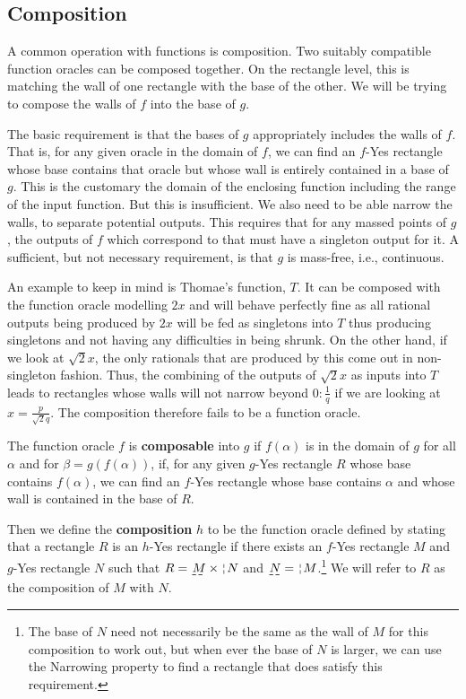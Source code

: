 \documentclass[12pt]{article}
\begin{document}
\subsection{Composition}

A common operation with functions is composition. Two suitably compatible function oracles can be composed together. On the rectangle level, this is matching the wall of one rectangle with the base of the other. We will be trying to compose the walls of $f$ into the base of $g$.

The basic requirement is that the bases of $g$ appropriately includes the walls of $f$. That is, for any given oracle in the domain of $f$, we can find an $f$-Yes rectangle whose base contains that oracle but whose wall is entirely contained in a base of $g$. This is the customary the domain of the enclosing function including the range of the input function. But this is insufficient. We also need to be able narrow the walls, to separate potential outputs. This requires that for any massed points of $g$, the outputs of $f$ which correspond to that must have a singleton output for it. A sufficient, but not necessary requirement, is that $g$ is mass-free, i.e., continuous. 

An example to keep in mind is Thomae's function, $T$. It can be composed with the function oracle modelling $2x$ and will behave perfectly fine as all rational outputs being produced by $2x$ will be fed as singletons into $T$ thus producing singletons and not having any difficulties in being shrunk.  On the other hand, if we look at $\sqrt{2} x$, the only rationals that are produced by this come out in non-singleton fashion. Thus, the combining of the outputs of $\sqrt{2} x$ as inputs into $T$ leads to rectangles whose walls will not narrow beyond $0:\frac{1}{q}$ if we are looking at $x = \frac{p}{\sqrt{2} q}$. The composition therefore fails to be a function oracle. 

The function oracle $f$ is \textbf{composable} into $g$ if $f(\alpha)$ is in the domain of $g$ for all $\alpha$ and for $\beta = g(f(\alpha))$, if, for any given $g$-Yes rectangle $R$ whose base contains $f(\alpha)$, we can find an $f$-Yes rectangle whose base contains $\alpha$ and whose wall is contained in the base of $R$.  

Then we define the \textbf{composition} $h$ to be the function oracle defined by stating that a rectangle $R$ is an $h$-Yes rectangle if there exists an $f$-Yes rectangle $M$ and $g$-Yes rectangle $N$  such that $R = \base{M} \times \wall{N}$ and $\base{N} = \wall{M}$.\footnote{The base of $N$ need not necessarily be the same as the wall of $M$ for this composition to work out, but when ever the base of $N$ is larger, we can use the Narrowing property to find a rectangle that does satisfy this requirement.} We will refer to $R$ as the composition of $M$ with $N$. 
\end{document}
